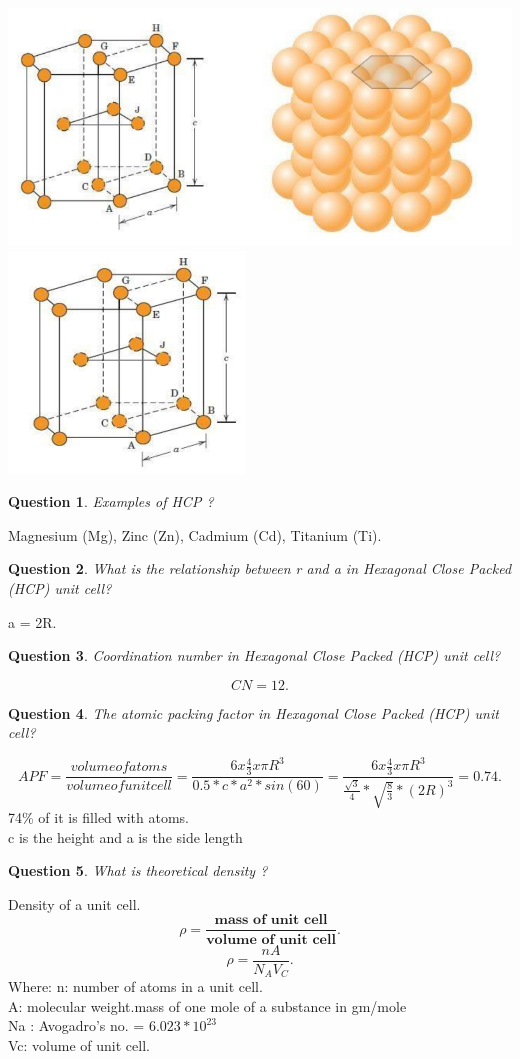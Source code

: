 \documentclass[13]{article}
\newtheorem{exer}{Question}
\begin{document}
\begin{center}
\includegraphics[scale=0.5]{figures/12.png} \includegraphics[scale=0.5]{figures/13.png}
\end{center}

\begin{exer}
Examples of HCP ?
\end{exer}
Magnesium (Mg), Zinc (Zn), Cadmium (Cd), Titanium (Ti).
\begin{exer}
What is the relationship between r and a in  Hexagonal Close Packed (HCP) unit cell?
\end{exer}
a = 2R.
\begin{exer}
Coordination number in  Hexagonal Close Packed (HCP) unit cell?
\end{exer}
\[
CN=12
.\] 
\begin{exer}
The atomic packing factor in  Hexagonal Close Packed (HCP) unit cell?
\end{exer}
\[
	APF = \frac{volume of atoms}{volume of unit cell} = \frac{6x \frac{4}{3} x \pi R^3}{0.5*c*a^2*sin(60)}= \frac{6x \frac{4}{3} x \pi R^3}{ \frac{\sqrt{3}}{4} * \sqrt{ \frac{8}{3}}*(2R)^3  } = 0.74
.\] 
74\% of it is filled with atoms. 
\\ c is the height and a is the side length
\begin{exer}
What is theoretical density ?
\end{exer}
Density of a unit cell. 
\[
	\rho = \frac{\textbf{mass of unit cell}}{ \textbf{volume of unit cell} }  
.\]
\[
\rho = \frac{nA}{N_AV_C} 
.\] 
Where: n: number of atoms in a unit cell. \\
A: molecular weight.mass of one mole of a substance in gm/mole \\
Na : Avogadro's  no. =  $6.023*10^{23}$\\
Vc: volume of unit cell. 
\end{document}
